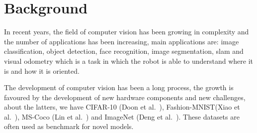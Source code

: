 
\section{Background}\label{sec:background}

In recent years, the field of computer vision has been growing in complexity and the number of applications has been increasing, main applications are: image classification, object detection, face recognition, image segmentation, \gls{slam} and visual odometry which is a task in which the robot is able to understand where it is and how it is oriented.

The development of computer vision has been a long process, the growth is favoured by the development of new hardware components and new challenges, about the latters, we have
CIFAR-10 (Doon et al.~\cite{cifar10_paper}), Fashion-MNIST(Xiao et al.~\cite{fashion_mnist_paper}), MS-Coco (Lin et al.~\cite{ms_coco_paper}) and ImageNet (Deng et al.~\cite{imagenet_paper}).
These datasets are often used as benchmark for novel models.

